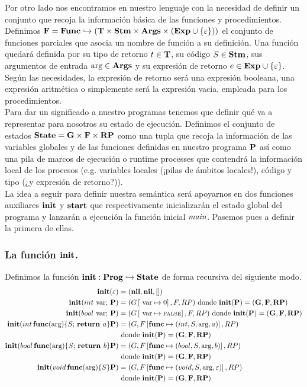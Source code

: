 Por otro lado nos encontramos en nuestro lenguaje con la necesidad de definir un conjunto que recoja la información básica de las funciones y procedimientos. Definimos $\F = \Func \hookrightarrow (\T \times \Stm \times \Args \times (\Exp \cup \{\varepsilon\}))$ el conjunto de funciones parciales que asocia un nombre de función a su definición. Una función quedará definida por su tipo de retorno $t \in \T$, su código $S \in \Stm$, sus argumentos de entrada $\args \in \Args$ y su expresión de retorno $e \in \Exp \cup \{\varepsilon\}$. Según las necesidades, la expresión de retorno será una expresión booleana, una expresión aritmética o simplemente será la expresión vacia, empleada para los procedimientos.\\

Para dar un significado a nuestro programas tenemos que definir qué va a representar para nosotros su estado de ejecución. Definimos el conjunto de estados $\State = \G \times \F \times \RP$ como una tupla que recoja la información de las variables globales y de las funciones definidas en nuestro programa $\P$ así como una pila de marcos de ejecución o runtime processes que contendrá la información local de los procesos (e.g. variables locales (¡pilas de ámbitos locales!), código y tipo (¿y expresión de retorno?)).\\

La idea a seguir para definir nuestra semántica será apoyarnos en dos funciones auxiliares $\init$ y $\start$ que respectivamente inicializarán el estado global del programa y lanzarán a ejecución la función inicial $\main$. Pasemos pues a definir la primera de ellas.

\subsubsection{La función $\init$.}
Definimos la función $\init: \Prog \hookrightarrow \State$ de forma recursiva del siguiente modo.
\begin{align*}
  \init(\varepsilon) &= (\nil, \nil, [])\\
  \init(int \var \; \P) &= (G\ass{\var}{0}, F, RP) \text{ donde } \init(\P) = (\G, \F, \RP)\\
  \init(bool \var \; \P) &= (G\ass{\var}{\False}, F, RP) \text{ donde } \init(\P) = (\G, \F, \RP)\\
  \init(int \, \func(\args) \{ S\; \return a\} \P) &= (G, F\ass{\func}{(int, S, \args, a)}, RP) \\ &\text{ donde } \init(\P) = (\G, \F, \RP)\\
  \init(bool \, \func(\args) \{ S\; \return b\} \P) &= (G, F\ass{\func}{(bool, S, \args, b)}, RP) \\ &\text{ donde } \init(\P) = (\G, \F, \RP)\\
  \init(void \, \func(\args) \{ S\} \P) &= (G, F\ass{\func}{(void, S, \args, \varepsilon)}, RP) \\ &\text{ donde } \init(\P) = (\G, \F, \RP)\\
\end{align*}
